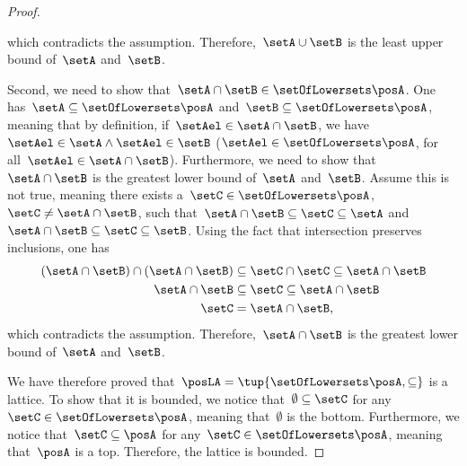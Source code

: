 \begin{proof}
\begin{compactitem}
\begin{equation}
        \end{equation}
        which contradicts the assumption.
        Therefore,~$\setA\cup \setB$ is the least upper bound of~$\setA$ and~$\setB$.
        \item Second, we need to show that~$\setA\cap \setB\in \setOfLowersets \posA$.
        One has~$\setA\subseteq \setOfLowersets \posA$ and~$\setB\subseteq \setOfLowersets \posA$, meaning that by definition, if~$\setAel\in \setA\cap \setB$, we have~$\setAel \in \setA\wedge \setAel\in \setB$ ($\setAel\in \setOfLowersets \posA$, for all~$\setAel\in \setA\cap \setB$).
        Furthermore, we need to show that~$\setA\cap \setB$ is the greatest lower bound of~$\setA$ and~$\setB$.
        Assume this is not true, meaning there exists a~$\setC\in \setOfLowersets \posA$,~$\setC\neq \setA\cap \setB$, such that~$\setA\cap \setB\subseteq \setC\subseteq \setA$ and~$\setA\cap \setB\subseteq \setC\subseteq \setB$.
        Using the fact that intersection preserves inclusions, one has
        \begin{equation}
            \begin{aligned}
                (\setA\cap \setB)
                \cap (\setA\cap \setB) & \subseteq \setC \cap \setC \subseteq \setA\cap \setB \\
                \setA\cap \setB        & \subseteq \setC\subseteq \setA\cap \setB             \\
                \setC                  & =\setA\cap \setB,                                    
            \end{aligned}
        \end{equation}
        which contradicts the assumption.
        Therefore,~$\setA\cap \setB$ is the greatest lower bound of~$\setA$ and~$\setB$.
    \end{compactitem}
    We have therefore proved that~$\posLA=\tup{\setOfLowersets \posA,\subseteq}$ is a lattice.
    To show that it is bounded, we notice that~$\emptyset \subseteq \setC$ for any~$\setC\in \setOfLowersets \posA$, meaning that~$\emptyset$ is the bottom.
    Furthermore, we notice that~$\setC\subseteq \posA$ for any~$\setC\in \setOfLowersets \posA$, meaning that~$\posA$ is a top.
    Therefore, the lattice is bounded.
\end{proof}
